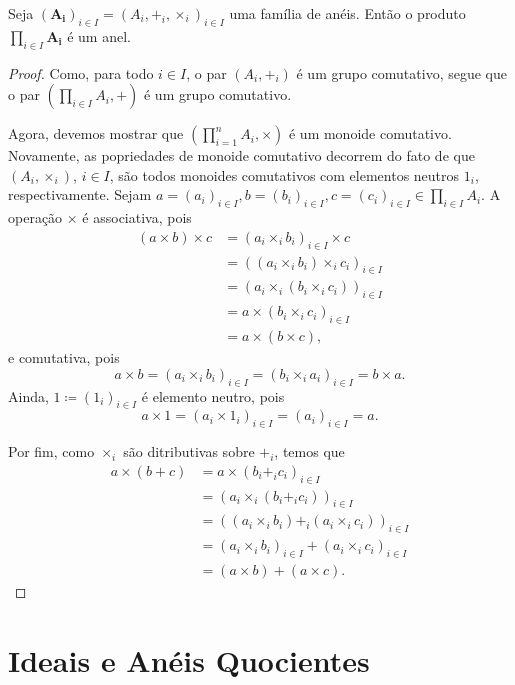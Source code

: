 \begin{prop}
Seja $(\bm{A_i})_{i \in I}=(A_i,+_i,\times_i)_{i \in I}$ uma família de anéis. Então o produto $\prod_{i \in I}\bm{A_i}$ é um anel.
\end{prop}
\begin{proof}
Como,  para todo $i \in I$, o par $(A_i,+_i)$ é um grupo comutativo, segue que o par $\left(\prod_{i \in I} A_i,+ \right)$ é um grupo comutativo.

Agora, devemos mostrar que $\left( \prod_{i=1}^n A_i,\times \right)$ é um monoide comutativo. Novamente, as popriedades de monoide comutativo decorrem do fato de que $(A_i,\times_i)$, $i \in I$, são todos monoides comutativos com elementos neutros $1_i$, respectivamente. Sejam $a=(a_i)_{i \in I}, b=(b_i)_{i \in I}, c=(c_i)_{i \in I} \in \prod_{i \in I} A_i$. A operação $\times$ é associativa, pois
	\begin{align*}
	(a \times b) \times c &= (a_i \times_i b_i)_{i \in I} \times c \\
		&= ((a_i \times_i b_i) \times_i c_i)_{i \in I} \\
		&= (a_i \times_i (b_i \times_i c_i))_{i \in I} \\
		&= a \times (b_i \times_i c_i)_{i \in I} \\
		&= a \times (b \times c),
	\end{align*}
e comutativa, pois
	\begin{equation*}
	a \times b = (a_i \times_i b_i)_{i \in I} = (b_i \times_i a_i)_{i \in I} = b \times a.
	\end{equation*}
Ainda, $1 \coloneqq (1_i)_{i \in I}$ é elemento neutro, pois
	\begin{equation*}
	a \times 1 = (a_i \times 1_i)_{i \in I} = (a_i)_{i \in I} = a.
	\end{equation*}

	Por fim, como $\times_i$ são ditributivas sobre $+_i$, temos que
	\begin{align*}
	a \times (b + c) &= a \times (b_i +_i c_i)_{i \in I} \\
		&= (a_i \times_i (b_i +_i c_i))_{i \in I} \\
		&= ((a_i \times_i b_i) +_i (a_i \times_i c_i))_{i \in I} \\
		&= (a_i \times_i b_i)_{i \in I} + (a_i \times_i c_i)_{i \in I} \\
		&= (a \times b) + (a \times c).
	\end{align*}
\end{proof}

\section{Ideais e Anéis Quocientes}

